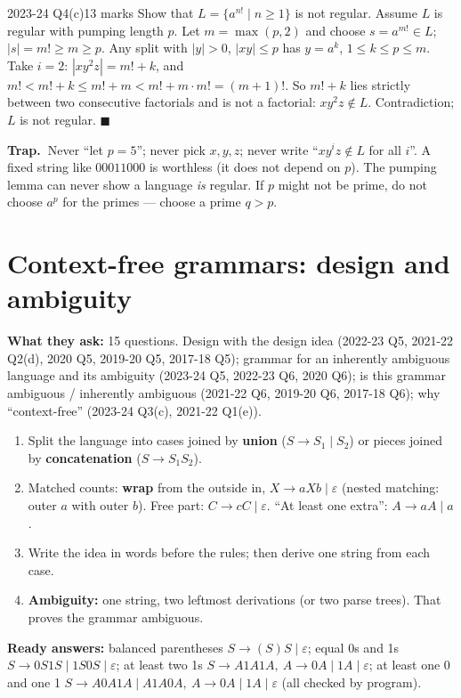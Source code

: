\documentclass[10.5pt,a4paper]{article}
\newcommand{\TRAP}{\textbf{\color{trapborder}Trap.\ }}
\newcommand{\asked}[1]{{\small\color{gray!60!black}\textbf{What they ask:} #1}\par}
\newcommand{\eps}{\varepsilon}
\begin{document}
\begin{examq}{2023-24 Q4(c)}{13 marks}
Show that $L=\{a^{n!}\mid n\ge1\}$ is not regular.
\tcblower
Assume $L$ is regular with pumping length $p$. Let $m=\max(p,2)$ and choose $s=a^{m!}\in L$; $|s|=m!\ge m\ge p$.
Any split with $|y|>0$, $|xy|\le p$ has $y=a^k$, $1\le k\le p\le m$. Take $i=2$: $|xy^2z|=m!+k$, and
$m!<m!+k\le m!+m<m!+m\cdot m!=(m+1)!$. So $m!+k$ lies strictly between two consecutive factorials and is not a factorial: $xy^2z\notin L$.
Contradiction; $L$ is not regular. $\blacksquare$
\end{examq}

\begin{trap}\TRAP Never ``let $p=5$''; never pick $x,y,z$; never write ``$xy^iz\notin L$ for all $i$''. A fixed string like $00011000$ is
worthless (it does not depend on $p$). The pumping lemma can never show a language \emph{is} regular. If $p$ might not be prime, do not
choose $a^p$ for the primes --- choose a prime $q>p$.\end{trap}

\section{Context-free grammars: design and ambiguity}
\asked{15 questions. Design with the design idea (2022-23 Q5, 2021-22 Q2(d), 2020 Q5, 2019-20 Q5, 2017-18 Q5); grammar for an inherently
ambiguous language and its ambiguity (2023-24 Q5, 2022-23 Q6, 2020 Q6); is this grammar ambiguous / inherently ambiguous (2021-22 Q6, 2019-20 Q6,
2017-18 Q6); why ``context-free'' (2023-24 Q3(c), 2021-22 Q1(e)).}
\begin{recipe}
\begin{enumerate}
\item Split the language into cases joined by \textbf{union} ($S\to S_1\mid S_2$) or pieces joined by \textbf{concatenation} ($S\to S_1S_2$).
\item Matched counts: \textbf{wrap} from the outside in, $X\to aXb\mid\eps$ (nested matching: outer $a$ with outer $b$).
Free part: $C\to cC\mid\eps$. ``At least one extra'': $A\to aA\mid a$.
\item Write the idea in words before the rules; then derive one string from each case.
\item \textbf{Ambiguity:} one string, two leftmost derivations (or two parse trees). That proves the grammar ambiguous.
\end{enumerate}
\textbf{Ready answers:} balanced parentheses $S\to(S)S\mid\eps$; equal 0s and 1s $S\to0S1S\mid1S0S\mid\eps$; at least two 1s
$S\to A1A1A,\ A\to0A\mid1A\mid\eps$; at least one 0 and one 1 $S\to A0A1A\mid A1A0A,\ A\to0A\mid1A\mid\eps$ (all checked by program).
\end{recipe}
\end{document}
